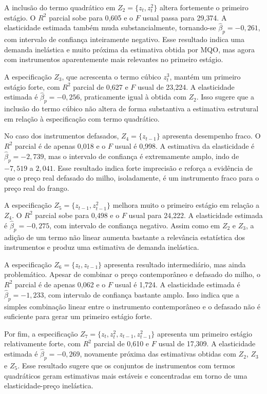 \documentclass[12pt,a4paper]{article}
\begin{document}
\begin{enumerate}[label=\textbf{\arabic*.}]
A inclusão do termo quadrático em $Z_2=\{z_t,z_t^2\}$ altera fortemente o primeiro estágio. O $R^2$ parcial sobe para 0{,}605 e o $F$ usual passa para 29{,}374. A elasticidade estimada também muda substancialmente, tornando-se $\hat{\beta}_p=-0{,}261$, com intervalo de confiança inteiramente negativo. Esse resultado indica uma demanda inelástica e muito próxima da estimativa obtida por MQO, mas agora com instrumentos aparentemente mais relevantes no primeiro estágio.

A especificação $Z_3$, que acrescenta o termo cúbico $z_t^3$, mantém um primeiro estágio forte, com $R^2$ parcial de 0{,}627 e $F$ usual de 23{,}224. A elasticidade estimada é $\hat{\beta}_p=-0{,}256$, praticamente igual à obtida com $Z_2$. Isso sugere que a inclusão do termo cúbico não altera de forma substantiva a estimativa estrutural em relação à especificação com termo quadrático.

No caso dos instrumentos defasados, $Z_4=\{z_{t-1}\}$ apresenta desempenho fraco. O $R^2$ parcial é de apenas 0{,}018 e o $F$ usual é 0{,}998. A estimativa da elasticidade é $\hat{\beta}_p=-2{,}739$, mas o intervalo de confiança é extremamente amplo, indo de $-7{,}519$ a $2{,}041$. Esse resultado indica forte imprecisão e reforça a evidência de que o preço real defasado do milho, isoladamente, é um instrumento fraco para o preço real do frango.

A especificação $Z_5=\{z_{t-1},z_{t-1}^2\}$ melhora muito o primeiro estágio em relação a $Z_4$. O $R^2$ parcial sobe para 0{,}498 e o $F$ usual para 24{,}222. A elasticidade estimada é $\hat{\beta}_p=-0{,}275$, com intervalo de confiança negativo. Assim como em $Z_2$ e $Z_3$, a adição de um termo não linear aumenta bastante a relevância estatística dos instrumentos e produz uma estimativa de demanda inelástica.

A especificação $Z_6=\{z_t,z_{t-1}\}$ apresenta resultado intermediário, mas ainda problemático. Apesar de combinar o preço contemporâneo e defasado do milho, o $R^2$ parcial é de apenas 0{,}062 e o $F$ usual é 1{,}724. A elasticidade estimada é $\hat{\beta}_p=-1{,}233$, com intervalo de confiança bastante amplo. Isso indica que a simples combinação linear entre o instrumento contemporâneo e o defasado não é suficiente para gerar um primeiro estágio forte.

Por fim, a especificação $Z_7=\{z_t,z_t^2,z_{t-1},z_{t-1}^2\}$ apresenta um primeiro estágio relativamente forte, com $R^2$ parcial de 0{,}610 e $F$ usual de 17{,}309. A elasticidade estimada é $\hat{\beta}_p=-0{,}269$, novamente próxima das estimativas obtidas com $Z_2$, $Z_3$ e $Z_5$. Esse resultado sugere que os conjuntos de instrumentos com termos quadráticos geram estimativas mais estáveis e concentradas em torno de uma elasticidade-preço inelástica.


\end{enumerate}
\end{document}
